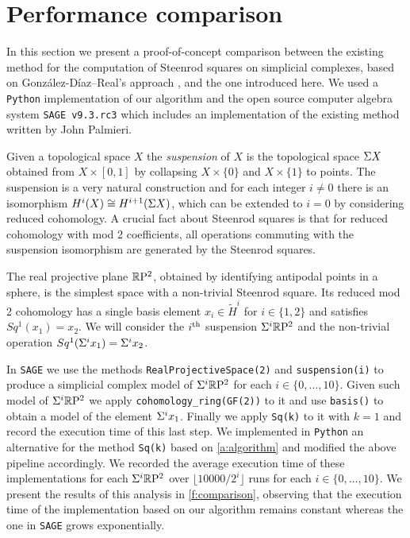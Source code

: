 
\section{Performance comparison} \label{s:comparison}

In this section we present a proof-of-concept comparison between the existing method for the computation of Steenrod squares on simplicial complexes, based on Gonz\'alez-D\'iaz--Real's approach \cite[Corollary 3.2]{gonzalez1999combinatorial}, and the one introduced here.
We used a \verb|Python| implementation of our algorithm and the open source computer algebra system \verb|SAGE v9.3.rc3| \cite{sagemath} which includes an implementation of the existing method written by John Palmieri.

Given a topological space $X$ the \textit{suspension} of $X$ is the topological space $\Sigma X$ obtained from $X \times [0,1]$ by collapsing $X \times \{0\}$ and $X \times \{1\}$ to points.
The suspension is a very natural construction and for each integer $i \neq 0$ there is an isomorphism $H^i(X) \cong H^{i+1}(\Sigma X)$, which can be extended to $i = 0$ by considering reduced cohomology.
A crucial fact about Steenrod squares is that for reduced cohomology with mod 2 coefficients, all operations commuting with the suspension isomorphism are generated by the Steenrod squares.

The real projective plane $\mathbb{R}\mathrm{P}^2$, obtained by identifying antipodal points in a sphere, is the simplest space with a non-trivial Steenrod square.
Its reduced mod 2 cohomology has a single basis element $x_i \in \widetilde{H}^i$ for $i \in \{1, 2\}$ and satisfies $Sq^1(x_1) = x_2$.
We will consider the $i^\mathrm{th}$ suspension $\Sigma^i \mathbb{R}\mathrm{P}^2$ and the non-trivial operation $Sq^1(\Sigma^i x_1) = \Sigma^i x_2$.

In \verb|SAGE| we use the methods \verb|RealProjectiveSpace(2)| and \verb|suspension(i)| to produce a simplicial complex model of $\Sigma^i \mathbb{R}\mathrm{P}^2$ for each $i \in \{0, \dots, 10\}$.
Given such model of $\Sigma^i \mathbb{R}\mathrm{P}^2$ we apply \verb|cohomology_ring(GF(2))| to it and use \verb|basis()| to obtain a model of the element $\Sigma^i x_1$.
Finally we apply \verb|Sq(k)| to it with $k=1$ and record the execution time of this last step.
We implemented in \verb|Python| an alternative for the method \verb|Sq(k)| based on \cref{a:algorithm} and modified the above pipeline accordingly.
We recorded the average execution time of these implementations for each $\Sigma^i \mathbb{R}\mathrm{P}^2$ over $\lfloor 10000/2^i \rfloor$ runs for each $i \in \{0, \dots, 10\}$. We present the results of this analysis in \cref{f:comparison}, observing that the execution time of the implementation based on our algorithm remains constant whereas the one in \verb|SAGE| grows exponentially.

